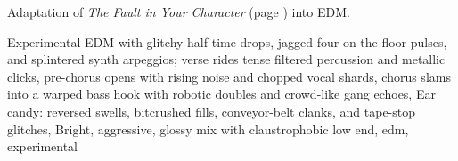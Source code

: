 
\begin{notes}
Adaptation of \emph{The Fault in Your Character} (page \pageref{sec:fault-in-your-character}) into EDM.
\end{notes}
\begin{style}
Experimental EDM with glitchy half-time drops, jagged four-on-the-floor pulses, and splintered synth arpeggios; verse rides tense filtered percussion and metallic clicks, pre-chorus opens with rising noise and chopped vocal shards, chorus slams into a warped bass hook with robotic doubles and crowd-like gang echoes, Ear candy: reversed swells, bitcrushed fills, conveyor-belt clanks, and tape-stop glitches, Bright, aggressive, glossy mix with claustrophobic low end, edm, experimental
\end{style}
